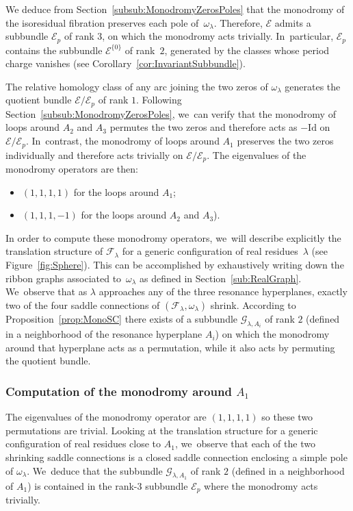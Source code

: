 \documentclass[11pt]{article}
\newcommand{\Id}{{\mathrm{Id}}}
\theoremstyle{definition}
\begin{document}
We deduce from Section~\ref{subsub:MonodromyZerosPoles} that the monodromy of the isoresidual fibration preserves each pole of~$\omega_{\lambda}$. Therefore, $\mathcal{E}$ admits a subbundle $\mathcal{E}_{p}$ of rank $3$, on which the monodromy acts trivially. In~particular, $\mathcal{E}_{p}$ contains the subbundle $\mathcal{E}^{\lbrace{ 0 \rbrace}}$ of rank~$2$, generated by the classes whose period charge vanishes (see Corollary~\ref{cor:InvariantSubbundle}).

The relative homology class of any arc joining the two zeros of $\omega_{\lambda}$ generates the quotient bundle $\mathcal{E}/\mathcal{E}_{p}$ of rank $1$. Following Section~\ref{subsub:MonodromyZerosPoles}, we~can verify that the monodromy of loops around $A_{2}$ and $A_{3}$ permutes the two zeros and therefore acts as $-\Id$ on $\mathcal{E}/\mathcal{E}_{p}$. In~contrast, the monodromy of loops around $A_{1}$ preserves the two zeros individually and therefore acts trivially on $\mathcal{E}/\mathcal{E}_{p}$. The eigenvalues of the monodromy operators are then:
\begin{itemize}
\item $(1,1,1,1)$ for the loops around $A_{1}$;
\item $(1,1,1,-1)$ for the loops around $A_{2}$ and $A_{3}$).
\end{itemize}
In order to compute these monodromy operators, we~will describe explicitly the translation structure of $\mathcal{F}_{\lambda}$ for a generic configuration of real residues~$\lambda$ (see Figure~\ref{fig:Sphere}). This can be accomplished by exhaustively writing down the ribbon graphs associated to~$\omega_\lambda$ as defined in Section~\ref{sub:RealGraph}. We~observe that as $\lambda$ approaches any of the three resonance hyperplanes, exactly two of the four saddle connections of $(\mathcal{F}_{\lambda},\omega_{\lambda})$ shrink. According to Proposition~\ref{prop:MonoSC} there exists of a subbundle $\mathcal{G}_{\lambda,A_{i}}$ of rank $2$ (defined in a neighborhood of the resonance hyperplane $A_{i}$) on which the monodromy around that hyperplane acts as a permutation, while it also acts by permuting the quotient bundle.

\subsubsection{Computation of the monodromy around $A_{1}$}

The eigenvalues of the monodromy operator are $(1,1,1,1)$ so these two permutations are trivial. Looking at the translation structure for a generic configuration of real residues close to $A_{1}$, we~observe that each of the two shrinking saddle connections is a closed saddle connection enclosing a simple pole of $\omega_{\lambda}$. We~deduce that the subbundle $\mathcal{G}_{\lambda,A_{1}}$ of rank $2$ (defined in a neighborhood of $A_{1}$) is contained in the rank-$3$ subbundle $\mathcal{E}_{p}$ where the monodromy acts trivially.
\end{document}
